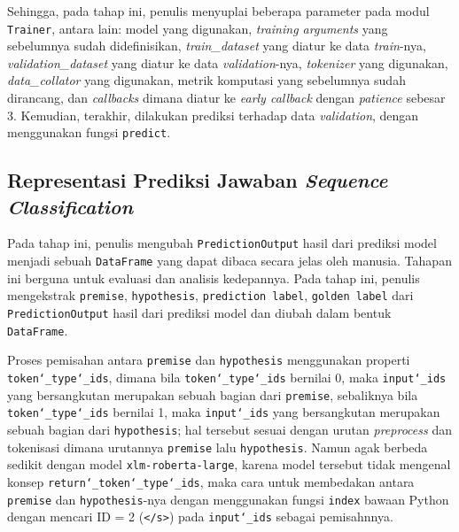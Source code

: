 Sehingga, pada tahap ini, penulis menyuplai beberapa parameter pada modul \texttt{Trainer}, antara lain: model yang digunakan, \emph{training arguments} yang sebelumnya sudah didefinisikan, \emph{train\_dataset} yang diatur ke data \emph{train}-nya, \emph{validation\_dataset} yang diatur ke data \emph{validation}-nya, \emph{tokenizer} yang digunakan, \emph{data\_collator} yang digunakan, metrik komputasi yang sebelumnya sudah dirancang, dan \emph{callbacks} dimana diatur ke \emph{early callback} dengan \emph{patience} sebesar 3. Kemudian, terakhir, dilakukan prediksi terhadap data \emph{validation}, dengan menggunakan fungsi \texttt{predict}.

\subsection{Representasi Prediksi Jawaban \emph{Sequence Classification}}
\label{4.1.10}
Pada tahap ini, penulis mengubah \texttt{PredictionOutput} hasil dari prediksi model menjadi sebuah \texttt{DataFrame} yang dapat dibaca secara jelas oleh manusia. Tahapan ini berguna untuk evaluasi dan analisis kedepannya. Pada tahap ini, penulis mengekstrak \texttt{premise}, \texttt{hypothesis}, \texttt{prediction label}, \texttt{golden label} dari \texttt{PredictionOutput} hasil dari prediksi model dan diubah dalam bentuk \texttt{DataFrame}. 

Proses pemisahan antara \texttt{premise} dan \texttt{hypothesis} menggunakan properti \texttt{token\char`_type\char`_ids}, dimana bila \texttt{token\char`_type\char`_ids} bernilai 0, maka \texttt{input\char`_ids} yang bersangkutan merupakan sebuah bagian dari \texttt{premise}, sebaliknya bila \texttt{token\char`_type\char`_ids} bernilai 1, maka \texttt{input\char`_ids} yang bersangkutan merupakan sebuah bagian dari \texttt{hypothesis}; hal tersebut sesuai dengan urutan \emph{preprocess} dan tokenisasi dimana urutannya \texttt{premise} lalu \texttt{hypothesis}. Namun agak berbeda sedikit dengan model \texttt{xlm-roberta-large}, karena model tersebut tidak mengenal konsep \texttt{return\char`_token\char`_type\char`_ids}, maka cara untuk membedakan antara \texttt{premise} dan \texttt{hypothesis}-nya dengan menggunakan fungsi \texttt{index} bawaan Python dengan mencari ID = 2 (\texttt{</s>}) pada \texttt{input\char`_ids} sebagai pemisahnnya. 

